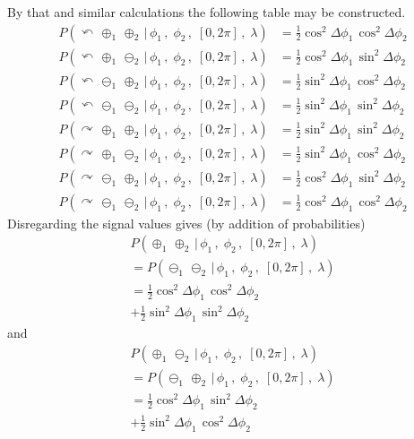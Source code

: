 \documentclass[9pt,technote]{IEEEtran}
\begin{document}
By that and similar calculations the following table may be
constructed.
\begin{align}
  P(\curvearrowleft\,\oplus_1\,\oplus_2\,|\,\phi_1\,,\; \phi_2\,,\; [0,2\pi]\,,\; \lambda) &=
  \frac{1}{2} \cos^2 \Delta\phi_1\, \cos^2 \Delta\phi_2 \\
  P(\curvearrowleft\,\oplus_1\,\ominus_2\,|\,\phi_1\,,\; \phi_2\,,\; [0,2\pi]\,,\; \lambda) &=
  \frac{1}{2} \cos^2 \Delta\phi_1\, \sin^2 \Delta\phi_2 \\
  P(\curvearrowleft\,\ominus_1\,\oplus_2\,|\,\phi_1\,,\; \phi_2\,,\; [0,2\pi]\,,\; \lambda) &=
  \frac{1}{2} \sin^2 \Delta\phi_1\, \cos^2 \Delta\phi_2 \\
  P(\curvearrowleft\,\ominus_1\,\ominus_2\,|\,\phi_1\,,\; \phi_2\,,\; [0,2\pi]\,,\; \lambda) &=
  \frac{1}{2} \sin^2 \Delta\phi_1\, \sin^2 \Delta\phi_2 \\
  P(\curvearrowright\,\oplus_1\,\oplus_2\,|\,\phi_1\,,\; \phi_2\,,\; [0,2\pi]\,,\; \lambda) &=
  \frac{1}{2} \sin^2 \Delta\phi_1\, \sin^2 \Delta\phi_2 \\
  P(\curvearrowright\,\oplus_1\,\ominus_2\,|\,\phi_1\,,\; \phi_2\,,\; [0,2\pi]\,,\; \lambda) &=
  \frac{1}{2} \sin^2 \Delta\phi_1\, \cos^2 \Delta\phi_2 \\
  P(\curvearrowright\,\ominus_1\,\oplus_2\,|\,\phi_1\,,\; \phi_2\,,\; [0,2\pi]\,,\; \lambda) &=
  \frac{1}{2} \cos^2 \Delta\phi_1\, \sin^2 \Delta\phi_2 \\
  P(\curvearrowright\,\ominus_1\,\ominus_2\,|\,\phi_1\,,\; \phi_2\,,\; [0,2\pi]\,,\; \lambda) &=
  \frac{1}{2} \cos^2 \Delta\phi_1\, \cos^2 \Delta\phi_2
\end{align}
Disregarding the signal values gives (by addition of probabilities)
\begin{multline}
  \label{coscos}
  P(\oplus_1\,\oplus_2\,|\,\phi_1\,,\; \phi_2\,,\; [0,2\pi]\,,\; \lambda) \\ =
 P(\ominus_1\,\ominus_2\,|\,\phi_1\,,\; \phi_2\,,\; [0,2\pi]\,,\; \lambda) \\ =
   \frac{1}{2} \cos^2 \Delta\phi_1\, \cos^2 \Delta\phi_2 \\
  + \frac{1}{2} \sin^2 \Delta\phi_1\, \sin^2 \Delta\phi_2
\end{multline}
and
\begin{multline}
  \label{cossin}
  P(\oplus_1\,\ominus_2\,|\,\phi_1\,,\; \phi_2\,,\; [0,2\pi]\,,\; \lambda) \\ =
  P(\ominus_1\,\oplus_2\,|\,\phi_1\,,\; \phi_2\,,\; [0,2\pi]\,,\; \lambda) \\ =
  \frac{1}{2} \cos^2 \Delta\phi_1\, \sin^2 \Delta\phi_2 \\
  + \frac{1}{2} \sin^2 \Delta\phi_1\, \cos^2 \Delta\phi_2
\end{multline}
\end{document}
